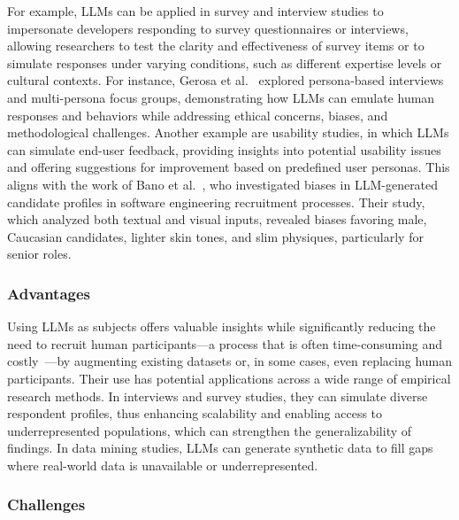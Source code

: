 For example, LLMs can be applied in survey and interview studies to impersonate developers responding to survey questionnaires or interviews, allowing researchers to test the clarity and effectiveness of survey items or to simulate responses under varying conditions, such as different expertise levels or cultural contexts. For instance, Gerosa et al.~\cite{DBLP:journals/ase/GerosaTSS24} explored persona-based interviews and multi-persona focus groups, demonstrating how LLMs can emulate human responses and behaviors while addressing ethical concerns, biases, and methodological challenges.
Another example are usability studies, in which LLMs can simulate end-user feedback, providing insights into potential usability issues and offering suggestions for improvement based on predefined user personas. This aligns with the work of Bano et al.~\cite{bano2025doessoftwareengineerlook}, who investigated biases in LLM-generated candidate profiles in software engineering recruitment processes. Their study, which analyzed both textual and visual inputs, revealed biases favoring male, Caucasian candidates, lighter skin tones, and slim physiques, particularly for senior roles.

\subsubsection{Advantages}

Using LLMs as subjects offers valuable insights while significantly reducing the need to recruit human participants—a process that is often time-consuming and costly~\cite{DBLP:conf/vl/Madampe0HO24}—by augmenting existing datasets or, in some cases, even replacing human participants. 
Their use has potential applications across a wide range of empirical research methods.
In interviews and survey studies, they can simulate diverse respondent profiles, thus enhancing scalability and enabling access to underrepresented populations, which can strengthen the generalizability of findings. 
In data mining studies, LLMs can generate synthetic data to fill gaps where real-world data is unavailable or underrepresented.

\subsubsection{Challenges}

